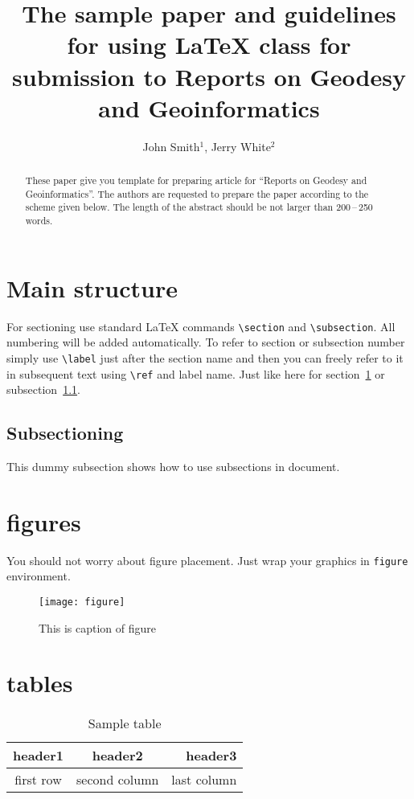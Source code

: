 \documentclass{rog}
\title{The sample paper and guidelines for using \LaTeX{} class for submission to Reports on Geodesy and Geoinformatics}
\author[Smith, J., White, J.]{John Smith$^1$, Jerry White$^2$}
\affiliation{1}
\begin{document}
    \maketitle

    \begin{abstract}
      These paper give you template for preparing article for ``Reports on 
      Geodesy and Geoinformatics''. The authors are requested to prepare the 
      paper according to the scheme given below. The length of the abstract 
      should be not larger than 200\,–\,250 words.
    \end{abstract}


  \section{Main structure}
    \label{labelforsection}
    For sectioning use standard \LaTeX{} commands
    \verb$\section$ and \verb$\subsection$.
    All numbering will be added automatically.
    To refer to section or subsection number
    simply use \verb$\label$ just after the section
    name and then you can freely refer to it in subsequent text
    using \verb$\ref$ and label name.
    Just like here for section~\ref{labelforsection} or
    subsection~\ref{labelforsubsection}.

  \subsection{Subsectioning}
    \label{labelforsubsection}
    This dummy subsection shows how to use subsections in document.

  \section{figures}
    You should not worry about figure placement.
    Just wrap your graphics in \texttt{figure}
    environment.
  \begin{figure}
      \texttt{[image: figure]}
      \caption{This is caption of figure}
    \end{figure}

  \section{tables}
    \begin{table}
      \caption{Sample table}
    \begin{tabular}{ccr}
      \toprule
      header1 & header2 & header3 \\
      \midrule
      first row & second column & last column\\
      \bottomrule
    \end{tabular}
  \end{table}
\end{document}
